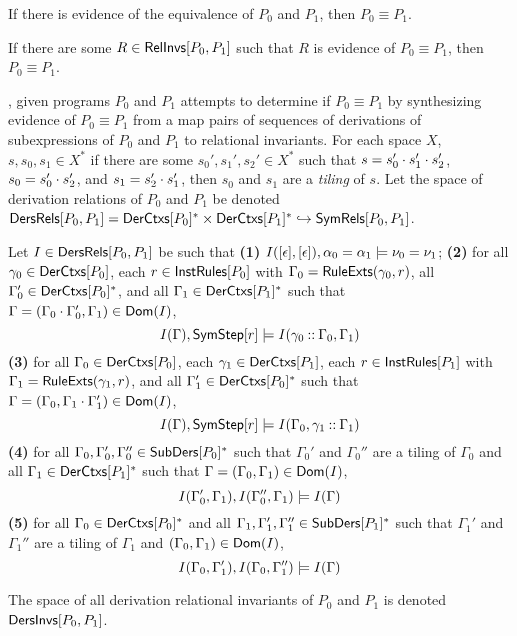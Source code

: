 If there is evidence of the equivalence of $P_0$ and $P_1$, then $P_0
\equiv P_1$.
%
\begin{lemma}
  \label{lemma:equiv-evidence}
  If there are some $R \in \mathsf{RelInvs}[ P_0, P_1 ]$ such that $R$ is
  evidence of $P_0 \equiv P_1$, then $P_0 \equiv P_1$.
\end{lemma}

\sys, given programs $P_0$ and $P_1$ attempts to determine if $P_0
\equiv P_1$ by synthesizing evidence of $P_0 \equiv P_1$ from a map
pairs of sequences of derivations of subexpressions of $P_0$ and $P_1$
to relational invariants.
For each space $X$, $s, s_0, s_1 \in X^{*}$ if there are some $s_0',
s_1', s_2' \in X^{*}$ such that $s = s_0' \cdot s_1' \cdot s_2'$,
$s_0 = s_0' \cdot s_2'$, and $s_1 = s_2' \cdot s_1'$, then $s_0$
and $s_1$ are a \emph{tiling} of $s$.
%
Let the space of derivation relations of $P_0$ and $P_1$ be denoted
$\mathsf{DersRels}[  P_0 ,  P_1  ] = \mathsf{DerCtxs}[ P_0 ]^{*} \times
\mathsf{DerCtxs}[ P_1 ]^{*} \hookrightarrow \mathsf{SymRels}[ P_0, P_1 ]$.
%
%
\begin{defn}
  \label{defn:der-invs}
  Let $I \in \mathsf{DersRels}[  P_0 ,  P_1  ] $ be such that
  \textbf{(1)} $I([ \epsilon ], [ \epsilon ]), \alpha_0 = \alpha_1
  \models \nu_0 = \nu_1$;
  \textbf{(2)} for all $\gamma_0 \in \mathsf{DerCtxs}[  P_0  ]$, %
  each $r \in \mathsf{InstRules}[  P_0  ]$ with $\Gamma_0 = \mathsf{RuleExts}( \gamma_0,
  r) $, %
  all $\Gamma_0' \in \mathsf{DerCtxs}[  P_0  ]^{*}$, and %
  all $\Gamma_1 \in \mathsf{DerCtxs}[ P_1 ]^{*}$ such that $\Gamma = (\Gamma_0
  \cdot \Gamma_0', \Gamma_1) \in \mathsf{Dom}(I)$,
  \[ I(\Gamma), \symstep{ r } \entails %
  I( \gamma_0 \cons \Gamma_0, \Gamma_1) \]
  \textbf{(3)} for all $\Gamma_0 \in \mathsf{DerCtxs}[  P_0  ]$, %
  each $\gamma_1 \in \mathsf{DerCtxs}[  P_1  ]$, %
  each $r \in \mathsf{InstRules}[  P_1  ]$ with $\Gamma_1 = \mathsf{RuleExts}( \gamma_1,
  r)$, and %
  all $\Gamma_1' \in \mathsf{DerCtxs}[  P_0  ]^{*}$ such that $\Gamma =
  (\Gamma_0, \Gamma_1 \cdot \Gamma_1') \in \mathsf{Dom}(I)$,
  \[ I(\Gamma), \symstep{ r } \entails %
  I( \Gamma_0, \gamma_1 \cons \Gamma_1) \]
  \textbf{(4)} for all $\Gamma_0, \Gamma_0', \Gamma_0'' \in
  \mathsf{SubDers}[ P_0 ]^{*}$ such that $\Gamma_0'$ and $\Gamma_0''$ are a
  tiling of $\Gamma_0$ and all $\Gamma_1 \in \mathsf{DerCtxs}[ P_1 ]^{*}$ such
  that $\Gamma = (\Gamma_0, \Gamma_1) \in \mathsf{Dom}(I)$,
  \[ I(\Gamma_0', \Gamma_1), I(\Gamma_0'', \Gamma_1) \entails %
  I(\Gamma) \]
  \textbf{(5)} for all $\Gamma_0 \in \mathsf{DerCtxs}[ P_0 ]^{*}$ and %
  all $\Gamma_1, \Gamma_1', \Gamma_1'' \in \mathsf{SubDers}[ P_1 ]^{*}$ such
  that $\Gamma_1'$ and $\Gamma_1''$ are a tiling of $\Gamma_1$ and
  $(\Gamma_0, \Gamma_1) \in \mathsf{Dom}(I)$,
  \[ I(\Gamma_0, \Gamma_1'), I(\Gamma_0, \Gamma_1'') \entails %
  I(\Gamma) \]
\end{defn}
%
The space of all derivation relational invariants of $P_0$ and $P_1$
is denoted $\mathsf{DersInvs}[  P_0 ,  P_1  ]$.
%

